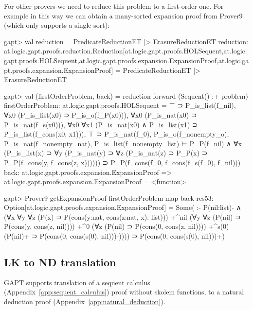 \documentclass[a4paper,11pt]{article}
\begin{document}
For other provers we need to reduce this problem to a first-order one.  For
example in this way we can obtain a many-sorted expansion proof from Prover9
(which only supports a single sort):
\begin{clilisting}
gapt> val reduction = PredicateReductionET |> ErasureReductionET
reduction: at.logic.gapt.proofs.reduction.Reduction[at.logic.gapt.proofs.HOLSequent,at.logic.gapt.proofs.HOLSequent,at.logic.gapt.proofs.expansion.ExpansionProof,at.logic.gapt.proofs.expansion.ExpansionProof] = PredicateReductionET |> ErasureReductionET

gapt> val (firstOrderProblem, back) = reduction forward (Sequent() :+ problem)
firstOrderProblem: at.logic.gapt.proofs.HOLSequent =
⊤ ⊃ P_is_list(f_nil),
∀x0 (P_is_list(x0) ⊃ P_is_o(f_P(x0))),
∀x0 (P_is_nat(x0) ⊃ P_is_nat(f_s(x0))),
∀x0 ∀x1 (P_is_nat(x0) ∧ P_is_list(x1) ⊃ P_is_list(f_cons(x0, x1))),
⊤ ⊃ P_is_nat(f_0),
P_is_o(f_nonempty_o),
P_is_nat(f_nonempty_nat),
P_is_list(f_nonempty_list)
⊢
P_P(f_nil) ∧
    ∀x
      (P_is_list(x) ⊃
        ∀y
          (P_is_nat(y) ⊃
            ∀z (P_is_nat(z) ⊃ P_P(x) ⊃ P_P(f_cons(y, f_cons(z, x)))))) ⊃
  P_P(f_cons(f_0, f_cons(f_s(f_0), f_nil)))
back: at.logic.gapt.proofs.expansion.ExpansionProof => at.logic.gapt.proofs.expansion.ExpansionProof = <function>

gapt> Prover9 getExpansionProof firstOrderProblem map back
res53: Option[at.logic.gapt.proofs.expansion.ExpansionProof] =
Some(
:-
P(nil:list)- ∧
    (∀x ∀y ∀z (P(x) ⊃ P(cons(y:nat, cons(z:nat, x): list)))
      +^{nil}
        (∀y ∀z (P(nil) ⊃ P(cons(y, cons(z, nil))))
          +^{0}
            (∀z (P(nil) ⊃ P(cons(0, cons(z, nil))))
              +^{s(0)} (P(nil)+ ⊃ P(cons(0, cons(s(0), nil)))-)))) ⊃
  P(cons(0, cons(s(0), nil)))+)

\end{clilisting}

\subsection{LK to ND translation}

GAPT supports translation of a sequent calculus
(Appendix~\ref{app:sequent_calculus}) proof without skolem functions,
to a natural deduction proof (Appendix~\ref{app:natural_deduction}).
\end{document}
